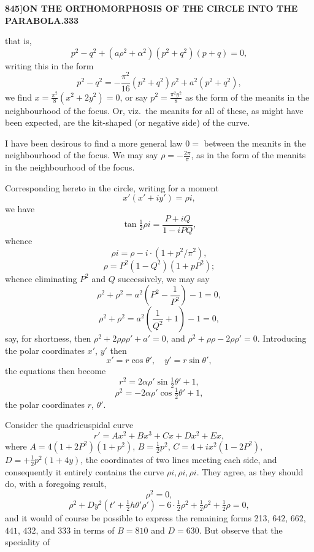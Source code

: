 \documentclass[12pt,a4paper]{article}
\theoremstyle{definition}
\begin{document}
\newpage
\setcounter{page}{333}

\noindent\textbf{845]}\hfill\textbf{ON THE ORTHOMORPHOSIS OF THE CIRCLE INTO THE PARABOLA.}\hfill\textbf{333}

\bigskip

\noindent that is,
\[
p^2 - q^2 + (a\rho^2 + \alpha^2)(p^2 + q^2)(p + q) = 0,
\]
writing this in the form
\[
p^2 - q^2 = -\frac{\pi^2}{16}(p^2 + q^2)\rho^2 + a^2(p^2 + q^2),
\]
we find $x = \frac{\pi^2}{8}(x^2 + 2y^2) = 0$, or say $p^2 = \frac{\pi^2 y^2}{8}$ as the form of the meanits in the neighbourhood of the focus. Or, viz.\ the meanits for all of these, as might have been expected, are the kit-shaped (or negative side) of the curve.

I have been desirous to find a more general law $0 = $ between the meanits in the neighbourhood of the focus. We may say $\rho = -\frac{2\pi}{\pi}$, as in the form of the meanits in the neighbourhood of the focus.

Corresponding hereto in the circle, writing for a moment
\[
x'(x' + iy') = \rho i,
\]
we have
\[
\tan\tfrac{1}{2}\rho i = \frac{P + iQ}{1 - iPQ},
\]
whence
\[
\rho i = \rho - i \cdot (1 + p^2/\pi^2),
\]
\[
\rho = P^2(1 - Q^2)(1 + pP^2);
\]
whence eliminating $P^2$ and $Q$ successively, we may say
\[
\rho^2 + \rho^2 = a^2 \left(P^2 - \frac{1}{P^2}\right) - 1 = 0,
\]
\[
\rho^2 + \rho^2 = a^2 \left(\frac{1}{Q^2} + 1\right) - 1 = 0,
\]
say, for shortness, then $\rho^2 + 2\rho\rho\rho' + a' = 0$, and $\rho^2 + \rho\rho - 2\rho\rho' = 0$. Introducing the polar coordinates $x'$, $y'$ then
\[
x' = r\cos\theta', \quad y' = r\sin\theta',
\]
the equations then become
\[
r^2 = 2\alpha\rho'\sin\tfrac{1}{2}\theta' + 1,
\]
\[
\rho^2 = -2\alpha\rho'\cos\tfrac{1}{2}\theta' + 1,
\]
the polar coordinates $r$, $\theta'$.

Consider the quadricuspidal curve
\[
r' = Ax^2 + Bx^3 + Cx + Dx^2 + Ex,
\]
where $A = 4(1 + 2P^2) (1 + p^2)$, $B = \frac{1}{2}p^2$, $C = 4 + ix^2(1 - 2P^2)$, $D = +\frac{1}{2}p^2(1 + 4y)$, the coordinates of two lines meeting each side, and consequently it entirely contains the curve $\rho i, \rho i, \rho i$. They agree, as they should do, with a foregoing result,
\[
\rho^2 = 0,
\]
\[
\rho^2 + Dy^2(t' + \tfrac{1}{2}h\theta'\rho') - 6 \cdot \tfrac{1}{2}\rho^2 + \tfrac{1}{2}\rho^2 + \tfrac{1}{2}\rho = 0,
\]
and it would of course be possible to express the remaining forms 213, $642$, $662$, $441$, $432$, and $333$ in terms of $B = 810$ and $D = 630$. But observe that the speciality of

\newpage
\setcounter{page}{334}
\end{document}
